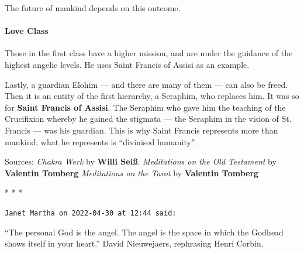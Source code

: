 The future of mankind depends on this outcome.

\paragraph{Love Class}
Those in the first class have a higher mission, and are under the guidance of the highest angelic levels. He uses Saint
Francis of Assisi as an example.

\begin{quotex}
Lastly, a guardian Elohim — and there are many of them — can also be freed. Then it is an entity
of the first hierarchy, a Seraphim, who replaces him. It was so for \textbf{Saint Francis of Assisi}. The Seraphim who
gave him the teaching of the Crucifixion whereby he gained the stigmata — the Seraphim in the vision of St.
Francis — was his guardian. This is why Saint Francis represents more than mankind; what he represents is
“divinised humanity”. 

\end{quotex}

\hfill

Sources:\newline
\emph{Chakra Werk} by \textbf{Willi Seiß}.\newline
\emph{Meditations on the Old Testament} by \textbf{Valentin Tomberg}\newline
\emph{Meditations on the Tarot} by \textbf{Valentin Tomberg}



\begin{center}* * *\end{center}


\begin{footnotesize}\begin{sffamily}

\texttt{Janet Martha on 2022-04-30 at 12:44 said: }

“The personal God is the angel. The angel is the space in which the Godhead shows itself in your heart.” David
Nieuwejaers, rephrasing Henri Corbin.


\end{sffamily}\end{footnotesize}